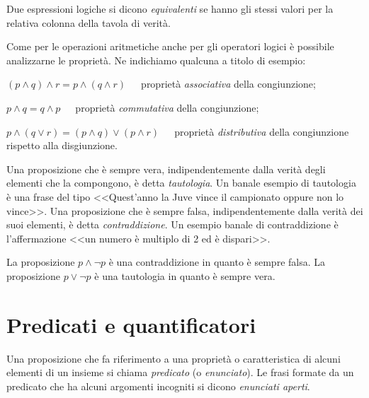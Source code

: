 Due espressioni logiche si dicono \emph{equivalenti} se hanno gli stessi valori per la relativa colonna della tavola di verità.

Come per le operazioni aritmetiche anche per gli operatori logici è possibile analizzarne le proprietà. Ne indichiamo qualcuna a titolo di esempio:
\begin{itemize*}
\item $(p\wedge q)\wedge r = p\wedge (q\wedge r)$~~~proprietà \emph{associativa} della congiunzione;
\item $p\wedge q = q \wedge p$~~~proprietà \emph{commutativa} della congiunzione;
\item $p\wedge (q\vee r) = (p\wedge q)\vee(p\wedge r)$~~~proprietà \emph{distributiva} della congiunzione rispetto alla disgiunzione.
\end{itemize*}

Una proposizione che è sempre vera, indipendentemente dalla verità degli elementi che la compongono, è detta \emph{tautologia}. Un banale esempio di tautologia è una frase del tipo <<Quest'anno la Juve vince il campionato oppure non lo vince>>. Una proposizione che è sempre falsa, indipendentemente dalla verità dei suoi elementi, è detta \emph{contraddizione}. Un esempio banale di contraddizione è l'affermazione <<un numero è multiplo di 2 ed è dispari>>.

\begin{exrig}
\begin{esempio}
	La proposizione $p\wedge \neg p$ è una contraddizione in quanto è sempre falsa.
	La proposizione $p\vee \neg p$ è una tautologia in quanto è sempre vera.
\end{esempio}
\end{exrig}

\vspazio\ovalbox{\risolvii \ref{ese:\thechapter.2}, \ref{ese:\thechapter.3}, \ref{ese:\thechapter.4}, \ref{ese:\thechapter.5}, \ref{ese:\thechapter.6}, \ref{ese:\thechapter.7}, \ref{ese:\thechapter.8}, \ref{ese:\thechapter.9}, \ref{ese:\thechapter.10}, \ref{ese:\thechapter.10}}

\section{Predicati e quantificatori}

Una proposizione che fa riferimento a una proprietà o caratteristica di alcuni elementi di un insieme si chiama \emph{predicato} (o \emph{enunciato}). Le frasi formate da un predicato che ha alcuni argomenti incogniti si dicono \emph{enunciati aperti}.

